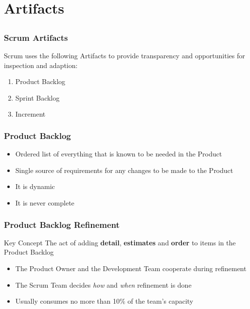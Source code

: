 \section{Artifacts}
\subsection{}

\begin{frame}
	\frametitle{Scrum Artifacts}
	Scrum uses the following Artifacts to provide transparency and opportunities for inspection and adaption:
	\vspace{1em}
	\begin{enumerate}
		\setlength\itemsep{0.7em}
		\item Product Backlog
		\item Sprint Backlog
		\item Increment
	\end{enumerate}
\end{frame}

\begin{frame}
	\frametitle{Product Backlog}
	\begin{itemize}
		\setlength\itemsep{0.7em}
		\item Ordered list of everything that is known to be needed in the Product
		\item Single source of requirements for any changes to be made to the Product
		\item It is dynamic
		\item It is never complete
	\end{itemize}
\end{frame}

\begin{frame}
	\frametitle{Product Backlog Refinement}
	\begin{block}{Key Concept}
		The act of adding \textbf{detail}, \textbf{estimates} and \textbf{order} to items in the Product Backlog
	\end{block}
	\vspace{0.5em}
	\begin{itemize}
		\setlength\itemsep{0.7em}
		\item The Product Owner and the Development Team cooperate during refinement
		\item The Scrum Team decides \textit{how} and \textit{when} refinement is done
		\item Usually consumes no more than 10\% of the team's capacity
	\end{itemize}
\end{frame}

